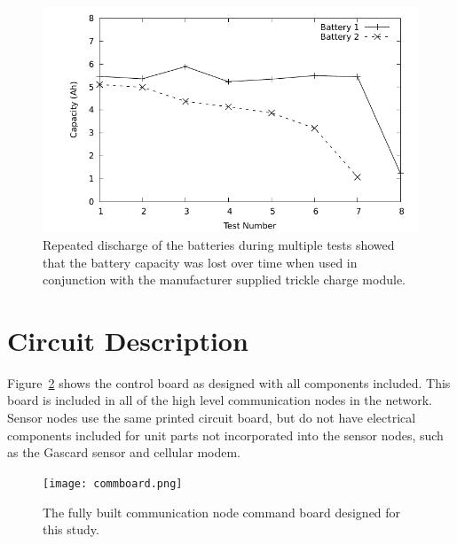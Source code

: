 \documentclass[journal]{IEEEtran}
\begin{document}
\begin{figure}[!t]
	\centering
	\includegraphics[width=\columnwidth,height=0.8\columnwidth,keepaspectratio]{decay.pdf}
	\caption[Battery Decay with Repeated Discharge]{Repeated discharge of the batteries during multiple tests showed that the battery capacity was lost over time when used in conjunction with the manufacturer supplied trickle charge module.}
	\label{fig:batterydecay}
\end{figure}

\section{Circuit Description}

Figure~\ref{fig:board} shows the control board as designed with all components included.  This board is included in all of the high level communication nodes in the network.  Sensor nodes use the same printed circuit board, but do not have electrical components included for unit parts not incorporated into the sensor nodes, such as the Gascard sensor and cellular modem.  

\begin{figure}[!t]
	\centering
	\texttt{[image: commboard.png]}
	\caption[Control board]{The fully built communication node command board designed for this study.}
	\label{fig:board}
\end{figure}
\end{document}

